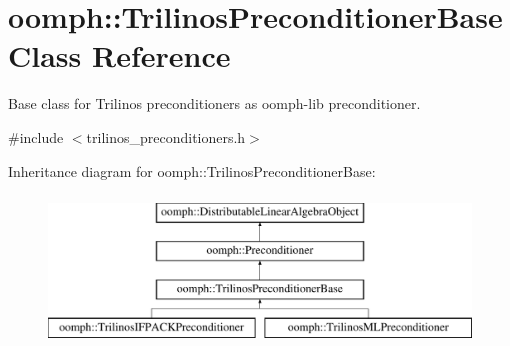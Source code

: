 \hypertarget{classoomph_1_1TrilinosPreconditionerBase}{}\section{oomph\+:\+:Trilinos\+Preconditioner\+Base Class Reference}
\label{classoomph_1_1TrilinosPreconditionerBase}


Base class for Trilinos preconditioners as oomph-\/lib preconditioner.  




{\ttfamily \#include $<$trilinos\+\_\+preconditioners.\+h$>$}

Inheritance diagram for oomph\+:\+:Trilinos\+Preconditioner\+Base\+:\begin{figure}[H]
\begin{center}
\leavevmode
\includegraphics[height=4.000000cm]{classoomph_1_1TrilinosPreconditionerBase}
\end{center}
\end{figure}
